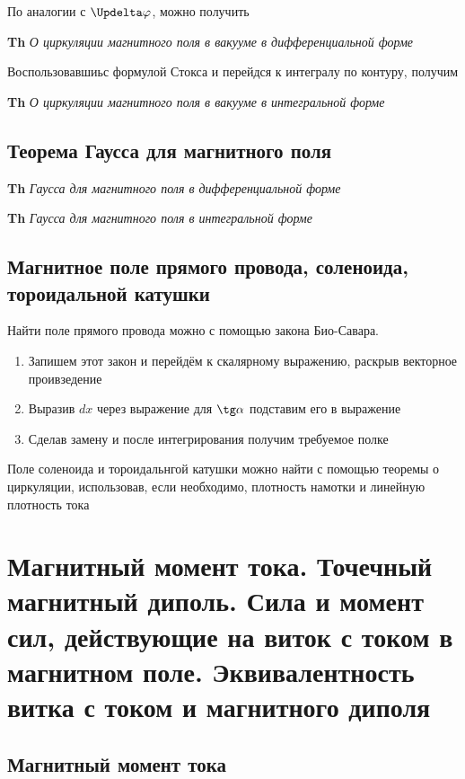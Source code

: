 \documentclass[a4paper, 14pt]{article}
\begin{document}
    По аналогии с $\Updelta \varphi$, можно получить
    
    \textbf{Th} \textit{О циркуляции магнитного поля в вакууме в дифференциальной форме}
    
    Воспользовавшиьс формулой Стокса и перейдся к интегралу по контуру, получим
    
    \textbf{Th} \textit{О циркуляции магнитного поля в вакууме в интегральной форме}
    
    \subsection{Теорема Гаусса для магнитного поля}
    
    \textbf{Th} \textit{Гаусса для магнитного поля в дифференциальной форме}
    
    \textbf{Th} \textit{Гаусса для магнитного поля в интегральной форме}
    
    \subsection{Магнитное поле прямого провода, соленоида, тороидальной катушки}
    
    Найти поле прямого провода можно с помощью закона Био-Савара.
    
    \begin{enumerate}
        \item Запишем этот закон и перейдём к скалярному выражению, раскрыв векторное проивзедение
        \item Выразив $dx$ через выражение для $\tg \alpha$ подставим его в выражение
        \item Сделав замену и после интегрирования получим требуемое полке
    \end{enumerate}
    
    Поле соленоида и тороидальнгой катушки можно найти с помощью теоремы о циркуляции, использовав, если необходимо,
    плотность намотки и линейную плотность тока
    
    \section{Магнитный момент тока.
    Точечный магнитный диполь.
    Сила и момент сил, действующие на виток с током в магнитном поле.
    Эквивалентность витка с током и магнитного диполя}
    
    \subsection{Магнитный момент тока}
    
\end{document}
